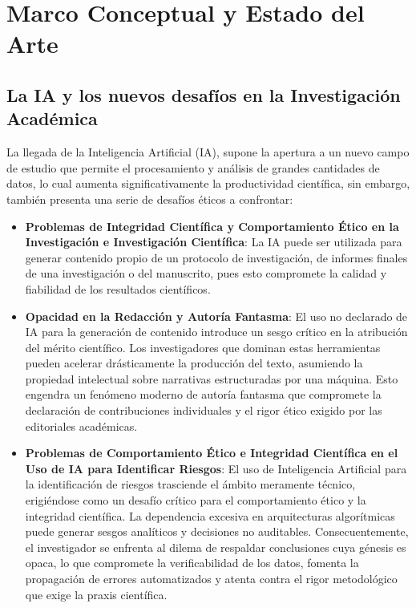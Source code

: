 \documentclass[12pt,a4paper]{article}
\begin{document}
\section{Marco Conceptual y Estado del Arte}
\label{sec:marco}

\subsection{La IA y los nuevos desafíos en la Investigación Académica}

La llegada de la Inteligencia Artificial (IA), supone la apertura a un nuevo campo de estudio que permite el procesamiento y análisis de grandes cantidades de datos, lo cual aumenta significativamente la productividad científica, sin embargo, también presenta una serie de desafíos éticos a confrontar:
 

\begin{itemize}
	\item \textbf{Problemas de Integridad Científica y Comportamiento Ético en la Investigación e Investigación Científica}: La IA puede ser utilizada para generar contenido propio de un protocolo de investigación, de informes finales de una investigación o del manuscrito, pues esto compromete la calidad y fiabilidad de los resultados científicos.
	
	\item \textbf{Opacidad en la Redacción y Autoría Fantasma}: El uso no declarado de IA para la generación de contenido introduce un sesgo crítico en la atribución del mérito científico. Los investigadores que dominan estas herramientas pueden acelerar drásticamente la producción del texto, asumiendo la propiedad intelectual sobre narrativas estructuradas por una máquina. Esto engendra un fenómeno moderno de autoría fantasma que compromete la declaración de contribuciones individuales y el rigor ético exigido por las editoriales académicas.
	
	\item \textbf{Problemas de Comportamiento Ético e Integridad Científica en el Uso de IA para Identificar Riesgos}: El uso de Inteligencia Artificial para la identificación de riesgos trasciende el ámbito meramente técnico, erigiéndose como un desafío crítico para el comportamiento ético y la integridad científica. La dependencia excesiva en arquitecturas algorítmicas puede generar sesgos analíticos y decisiones no auditables. Consecuentemente, el investigador se enfrenta al dilema de respaldar conclusiones cuya génesis es opaca, lo que compromete la verificabilidad de los datos, fomenta la propagación de errores automatizados y atenta contra el rigor metodológico que exige la praxis científica.
		
\end{itemize}
\end{document}
